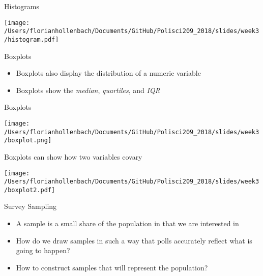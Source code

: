 \documentclass[presentation]{beamer}
\begin{document}
\begin{frame}[label={sec:orga453c42}]{Histograms}
\begin{center}
\texttt{[image: /Users/florianhollenbach/Documents/GitHub/Polisci209\_2018/slides/week3/histogram.pdf]}
\end{center}
\end{frame}


\begin{frame}[label={sec:org78c531f}]{Boxplots}
\begin{itemize}
\item Boxplots also display the distribution of a numeric variable
\item Boxplots show the \emph{median}, \emph{quartiles}, and \emph{IQR}
\end{itemize}
\end{frame}

\begin{frame}[label={sec:org8d50251}]{Boxplots}
\begin{center}
\texttt{[image: /Users/florianhollenbach/Documents/GitHub/Polisci209\_2018/slides/week3/boxplot.png]}
\end{center}
\end{frame}


\begin{frame}[label={sec:org9a70067}]{Boxplots can show how two variables covary}
\begin{center}
\texttt{[image: /Users/florianhollenbach/Documents/GitHub/Polisci209\_2018/slides/week3/boxplot2.pdf]}
\end{center}
\end{frame}

\begin{frame}[label={sec:org6c3610f}]{Survey Sampling}
\begin{itemize}
\item A sample is a small share of the population in that we are interested in
\end{itemize}

\pause

\begin{itemize}
\item How do we draw samples in such a way that polls accurately reflect what is going to happen?

\item How to construct samples that will represent the population?
\end{itemize}
\end{frame}
\end{document}
